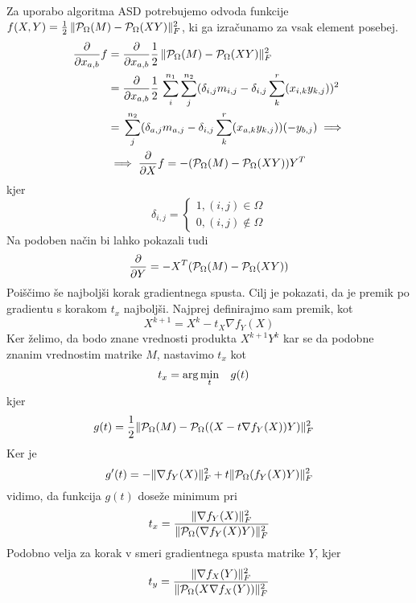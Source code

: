 Za uporabo algoritma ASD potrebujemo odvoda funkcije $f(X,Y) = \frac{1}{2}\, \lVert\mathcal{P}_\Omega(M) - \mathcal{P}_\Omega(XY)\rVert_F^2$, ki ga izračunamo za vsak element posebej.
\begin{align*}
    \frac{\partial}{\partial x_{a,b}} f &= \frac{\partial}{\partial x_{a,b}} \frac{1}{2}\, \lVert\mathcal{P}_\Omega(M) - \mathcal{P}_\Omega(XY)\rVert_F^2  \\
    &= \frac{\partial}{\partial x_{a,b}} \frac{1}{2}\, \sum_{i}^{n_1}\sum_{j}^{n_2}(\delta_{i,j}m_{i,j} - \delta_{i,j}\sum_{k}^{r}(x_{i,k}y_{k,j}))^2  \\
    &= \, \sum_{j}^{n_2}(\delta_{a,j}m_{a,j} - \delta_{i,j}\sum_{k}^{r}(x_{a,k}y_{k,j}))(-y_{b,j}) \implies \\
    &\implies \frac{\partial}{\partial X}f = -(\mathcal{P}_\Omega(M) - \mathcal{P}_\Omega(XY))Y^T
\end{align*}
kjer 
\[
    \delta_{i,j} = \begin{cases}
        1, (i, j) \in \Omega \\
        0, (i, j) \notin \Omega
    \end{cases}
\]
Na podoben način bi lahko pokazali tudi
\[
    \frac{\partial}{\partial Y} = -X^T (\mathcal{P}_\Omega(M) - \mathcal{P}_\Omega(XY))
\]
Poiščimo še najboljši korak gradientnega spusta.
Cilj je pokazati, da je premik po gradientu s korakom $t_x$ najboljši.
Najprej definirajmo sam premik, kot
\[
    X^{k+1} = X^k - t_X \nabla f_Y(X)
\]
Ker želimo, da bodo znane vrednosti produkta $X^{k+1}Y^{k}$ kar se da podobne znanim vrednostim matrike $M$, nastavimo $t_x$ kot 
\begin{align*}
    t_x &= \arg \min_t \hspace{0.3cm} g(t)
\end{align*} kjer
\begin{align*}
    g(t) &= \frac{1}{2} \lVert\mathcal{P}_\Omega(M) - \mathcal{P}_\Omega((X - t\nabla f_Y(X))Y)\rVert_F^2
\end{align*}
Ker je \cite{AST-TK15} 
\[
  g'(t) = -\lVert\nabla f_Y(X)\rVert_F^2 + t\lVert\mathcal{P}_\Omega(f_Y(X)Y)\rVert_F^2 
\]
vidimo, da funkcija $g(t)$ doseže minimum pri 
\[
  t_x = \frac{\lVert\nabla f_Y(X)\rVert_F^2}{\lVert\mathcal{P}_\Omega(\nabla f_Y(X)Y)\rVert_F^2}  
\]
Podobno velja za korak v smeri gradientnega spusta matrike $Y$, kjer
\[
  t_y = \frac{\lVert\nabla f_X(Y)\rVert_F^2}{\lVert\mathcal{P}_\Omega(X \nabla f_X(Y))\rVert_F^2}  
\]